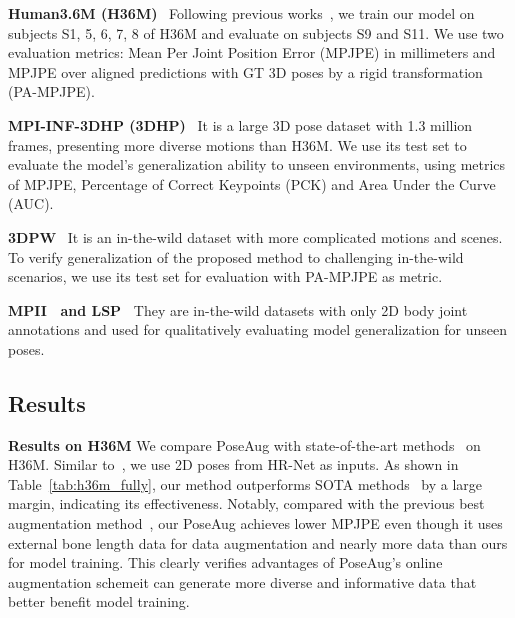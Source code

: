 \documentclass[final]{cvpr}
\newcommand{\myparagraph}[1]{{ \noindent \bf #1}}
\begin{document}
\myparagraph{Human3.6M (H36M)}~\cite{ionescu2014human3}
Following previous works~\cite{martinez2017simple,zhao2019semantic}, we train our model on subjects S1, 5, 6, 7, 8 of H36M and evaluate on subjects S9 and S11. We use two evaluation metrics:  Mean Per Joint Position Error (MPJPE)  in millimeters and  MPJPE over aligned predictions with  GT 3D poses by a rigid transformation (PA-MPJPE).

\myparagraph{MPI-INF-3DHP (3DHP)}~\cite{mehta2017vnect}
It is a large 3D pose dataset with 1.3 million frames, presenting more diverse motions than H36M. 
We use its test set to evaluate the model's generalization ability to unseen environments, using metrics of MPJPE, Percentage of Correct Keypoints (PCK) and Area Under the Curve (AUC).

\myparagraph{3DPW}~\cite{vonMarcard2018} 
It is an in-the-wild dataset with more complicated motions and scenes. 
To verify generalization of the proposed method to challenging in-the-wild scenarios, we use its test set for evaluation with PA-MPJPE as metric.


\myparagraph{\textbf{MPII}~\cite{andriluka20142d} and \textbf{LSP}~\cite{johnson2010clustered}}
They are in-the-wild datasets with only 2D body joint annotations and used for qualitatively evaluating model generalization for unseen poses. 


\subsection{Results}

\myparagraph{Results on H36M}
We compare PoseAug with state-of-the-art methods~\cite{zhao2019semantic,sharma2019monocular,pavllo2019videopose3d, moon2019camera,Li_2020_CVPR} on H36M. Similar to~\cite{Li_2020_CVPR}, we use 2D poses from HR-Net \cite{sun2019deep} as inputs. 
As shown in Table~\ref{tab:h36m_fully}, our method outperforms SOTA methods~\cite{zhao2019semantic,sharma2019monocular,pavllo2019videopose3d, moon2019camera} by a large margin, indicating its effectiveness. 
Notably, compared with the previous best augmentation method~\cite{Li_2020_CVPR}, our PoseAug achieves lower  MPJPE even though it uses external bone length data for data augmentation and nearly  more data than ours for model training. This clearly verifies advantages of PoseAug's online augmentation scheme\textemdash it can generate more diverse  and informative data that better benefit model training. 
\end{document}
